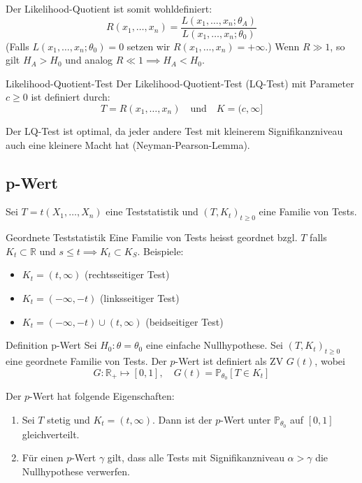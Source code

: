 \documentclass[a4paper,10pt]{article}
\def\R{\mathbb{R}}
\def\P{\mathbb{P}}
\begin{document}
\noindent Der Likelihood-Quotient ist somit wohldefiniert:
\[R(x_1, \ldots, x_n) = \frac{L(x_1,\ldots, x_n;\theta_A)}{L(x_1, \ldots, x_n;\theta_0)}\]
(Falls \(L(x_1, \ldots, x_n; \theta_0) = 0\) setzen wir \(R(x_1, \ldots, x_n) = +\infty\).) Wenn \(R \gg 1\), so gilt \(H_A > H_0\) und analog \(R \ll 1 \implies H_A < H_0\).

\begin{subbox}{Likelihood-Quotient-Test}
	Der Likelihood-Quotient-Test (LQ-Test) mit Parameter \(c \ge 0\) ist definiert durch:
	\[T = R(x_1, \ldots, x_n) \quad \text{und} \quad K = (c, \infty]\]
\end{subbox}
Der LQ-Test ist optimal, da jeder andere Test mit kleinerem Signifikanzniveau auch eine kleinere Macht hat (Neyman-Pearson-Lemma).

\subsection{p-Wert}
Sei \(T = t(X_1, \ldots, X_n)\) eine Teststatistik und \((T,K_t)_{t\ge 0}\) eine Familie von Tests.

\begin{subbox}{Geordnete Teststatistik}
	Eine Familie von Tests heisst geordnet bzgl. \(T\) falls \(K_t \subset \R\) und \(s \le t \implies K_t \subset K_S\). Beispiele:
	\begin{itemize}
		\item \(K_t = (t, \infty)\) (rechtsseitiger Test)
		\item \(K_t = (-\infty, -t)\) (linksseitiger Test)
		\item \(K_t = (-\infty, -t) \cup (t, \infty)\) (beidseitiger Test)
	\end{itemize}
\end{subbox}

\begin{mainbox}{Definition p-Wert}
	Sei \(H_0: \theta = \theta_0\) eine einfache Nullhypothese. Sei \((T, K_t)_{t\ge 0}\) eine geordnete Familie von Tests. Der \(p\)-Wert ist definiert als ZV \(G(t)\), wobei
	\[G: \R_+ \mapsto [0,1], \quad G(t) = \P_{\theta_0}[T \in K_t]\]
\end{mainbox}
Der \(p\)-Wert hat folgende Eigenschaften:
\begin{enumerate}
	\item Sei \(T\) stetig und \(K_t = (t, \infty)\). Dann ist der \(p\)-Wert unter \(\P_{\theta_0}\) auf \([0,1]\) gleichverteilt.
	\item Für einen \(p\)-Wert \(\gamma\) gilt, dass alle Tests mit Signifikanzniveau \(\alpha > \gamma\) die Nullhypothese verwerfen.
\end{enumerate}
\end{document}

